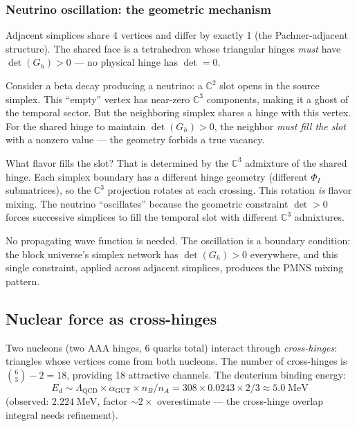 \subsubsection{Neutrino oscillation: the geometric mechanism}

Adjacent simplices share 4 vertices and differ by exactly 1 (the Pachner-adjacent structure). The shared face is a tetrahedron whose triangular hinges \emph{must} have $\det(G_h) > 0$ --- no physical hinge has $\det = 0$.

Consider a beta decay producing a neutrino: a $\mathbb{C}^2$ slot opens in the source simplex. This ``empty'' vertex has near-zero $\mathbb{C}^3$ components, making it a ghost of the temporal sector. But the neighboring simplex shares a hinge with this vertex. For the shared hinge to maintain $\det(G_h) > 0$, the neighbor \emph{must fill the slot} with a nonzero value --- the geometry forbids a true vacancy.

What flavor fills the slot? That is determined by the $\mathbb{C}^3$ admixture of the shared hinge. Each simplex boundary has a different hinge geometry (different $\Phi_I$ submatrices), so the $\mathbb{C}^3$ projection rotates at each crossing. This rotation \emph{is} flavor mixing. The neutrino ``oscillates'' because the geometric constraint $\det > 0$ forces successive simplices to fill the temporal slot with different $\mathbb{C}^3$ admixtures.

No propagating wave function is needed. The oscillation is a boundary condition: the block universe's simplex network has $\det(G_h) > 0$ everywhere, and this single constraint, applied across adjacent simplices, produces the PMNS mixing pattern.

\subsection{Nuclear force as cross-hinges}

Two nucleons (two AAA hinges, 6 quarks total) interact through \emph{cross-hinges}: triangles whose vertices come from both nucleons. The number of cross-hinges is $\binom{6}{3} - 2 = 18$, providing 18 attractive channels. The deuterium binding energy:
\begin{equation}
E_d \sim \Lambda_\text{QCD} \times \alpha_\text{GUT} \times n_B/n_A = 308 \times 0.0243 \times 2/3 \approx 5.0\;\text{MeV}
\end{equation}
(observed: $2.224\;\text{MeV}$, factor $\sim 2\times$ overestimate --- the cross-hinge overlap integral needs refinement).

